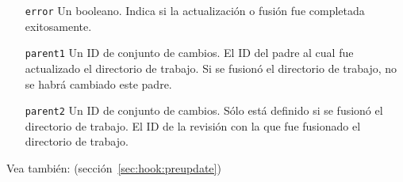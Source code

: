 \begin{itemize}
\item[\texttt{error}] Un booleano. Indica si la actualización o fusión
  fue completada exitosamente.
\item[\texttt{parent1}] Un ID de conjunto de cambios. El ID del padre
  al cual fue actualizado el directorio de trabajo. Si se fusionó el
  directorio de trabajo, no se habrá cambiado este padre.
\item[\texttt{parent2}] Un ID de conjunto de cambios. Sólo está
  definido si se fusionó el directorio de trabajo. El ID de la
  revisión con la que fue fusionado el directorio de trabajo.
\end{itemize}

Vea también:  (sección~\ref{sec:hook:preupdate})

